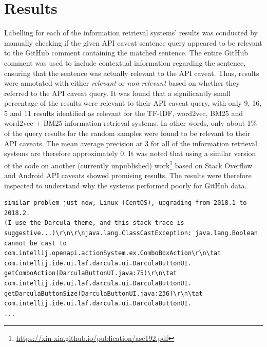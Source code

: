 \section{Results}
\label{sec:info-results}
Labelling for each of the information retrieval systems' results was conducted by manually checking if the given API caveat sentence query appeared to be relevant to the GitHub comment containing the matched sentence. The entire GitHub comment was used to include contextual information regarding the sentence, ensuring that the sentence was actually relevant to the API caveat. Thus, results were annotated with either \textit{relevant} or \textit{non-relevant} based on whether they referred to the API caveat query. It was found that a significantly small percentage of the results were relevant to their API caveat query, with only 9, 16, 5 and 11 results identified as relevant for the TF-IDF, word2vec, BM25 and word2vec + BM25 information retrieval systems. In other words, only about 1\% of the query results for the random samples were found to be relevant to their API caveats. The mean average precision at 3 for all of the information retrieval systems are therefore approximately 0. It was noted that using a similar version of the code on another (currently unpublished) work\footnote{\url{https://xin-xia.github.io/publication/ase192.pdf}} based on Stack Overflow and Android API caveats showed promising results. The results were therefore inspected to understand why the systems performed poorly for GitHub data.\\

\begin{lstlisting}[label=error-log,caption={Example of a GitHub comment containing an error log from \url{https://github.com/ChrisRM/material-theme-jetbrains/issues/863}},float,frame=tb,numbers=none,language=None]
similar problem just now, Linux (CentOS), upgrading from 2018.1 to 2018.2. 
(I use the Darcula theme, and this stack trace is suggestive...)\r\n\r\njava.lang.ClassCastException: java.lang.Boolean cannot be cast to com.intellij.openapi.actionSystem.ex.ComboBoxAction\r\n\tat com.intellij.ide.ui.laf.darcula.ui.DarculaButtonUI.
getComboAction(DarculaButtonUI.java:75)\r\n\tat com.intellij.ide.ui.laf.darcula.ui.DarculaButtonUI.
getDarculaButtonSize(DarculaButtonUI.java:236)\r\n\tat com.intellij.ide.ui.laf.darcula.ui.DarculaButtonUI.
...
\end{lstlisting}

